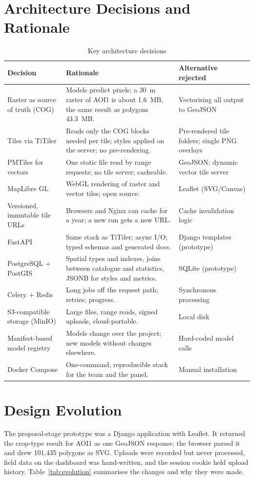 \section{Architecture Decisions and Rationale}
\begin{table}[htbp]
\centering\small
\caption{Key architecture decisions}
\label{tab:adr}
\begin{tabularx}{\textwidth}{L{3.6cm} Y L{3.6cm}}
\toprule
\textbf{Decision} & \textbf{Rationale} & \textbf{Alternative rejected}\\
\midrule
Raster as source of truth (COG) & Models predict pixels; a 30~m raster of AOI1 is about 1.6~MB, the same result as polygons 43.3~MB. & Vectorising all output to GeoJSON\\
Tiles via TiTiler & Reads only the COG blocks needed per tile; styles applied on the server; no pre-rendering. & Pre-rendered tile folders; single PNG overlays\\
PMTiles for vectors & One static file read by range requests; no tile server; cacheable. & GeoJSON; dynamic vector tile server\\
MapLibre GL & WebGL rendering of raster and vector tiles; open source. & Leaflet (SVG/Canvas)\\
Versioned, immutable tile URLs & Browsers and Nginx can cache for a year; a new run gets a new URL. & Cache invalidation logic\\
FastAPI & Same stack as TiTiler; async I/O; typed schemas and generated docs. & Django templates (prototype)\\
PostgreSQL + PostGIS & Spatial types and indexes, joins between catalogue and statistics, JSONB for styles and metrics. & SQLite (prototype)\\
Celery + Redis & Long jobs off the request path; retries; progress. & Synchronous processing\\
S3-compatible storage (MinIO) & Large files, range reads, signed uploads, cloud-portable. & Local disk\\
Manifest-based model registry & Models change over the project; new models without changes elsewhere. & Hard-coded model calls\\
Docker Compose & One-command, reproducible stack for the team and the panel. & Manual installation\\
\bottomrule
\end{tabularx}
\end{table}

\section{Design Evolution}\label{sec:evolution}
The proposal-stage prototype was a Django application with Leaflet. It returned the crop-type result
for AOI1 as one GeoJSON response; the browser parsed it and drew 101,435 polygons as SVG. Uploads
were recorded but never processed, field data on the dashboard was hand-written, and the session
cookie held upload history. Table~\ref{tab:evolution} summarises the changes and why they were made.

